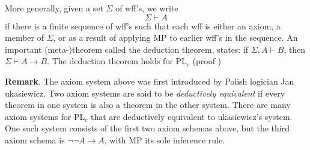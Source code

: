 \documentclass[12pt]{article}
\begin{document}
More generally, given a set $\Sigma$ of wff's, we write $$\Sigma \vdash A$$ if there is a finite sequence of wff's such that each wff is either an axiom, a member of $\Sigma$, or as a result of applying MP to earlier wff's in the sequence.  An important (meta-)theorem called the deduction theorem, states: if $\Sigma, A \vdash B$, then $\Sigma \vdash A\to B$.  The deduction theorem holds for PL$_c$ (proof )

\textbf{Remark}.  The axiom system above was first introduced by Polish logician Jan \text{\L}ukasiewicz.  Two axiom systems are said to be \emph{deductively equivalent} if every theorem in one system is also a theorem in the other system.  There are many axiom systems for PL$_c$ that are deductively equivalent to \text{\L}ukasiewicz's system.  One such system consists of the first two axiom schemas above, but the third axiom schema is $\neg \neg A \to A$, with MP its sole inference rule.

\end{document}
